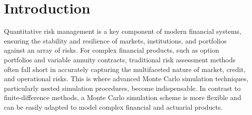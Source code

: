 \chapter{Introduction}

Quantitative risk management is a key component of modern financial systems, ensuring the stability and resilience of markets, institutions, and portfolios against an array of risks. 
For complex financial products, such as option portfolios and variable annuity contracts, traditional risk assessment methods often fall short in accurately capturing the multifaceted nature of market, credit, and operational risks. 
This is where advanced Monte Carlo simulation techniques, particularly nested simulation procedures, become indispensable.
In contrast to finite-difference methods, a Monte Carlo simulation scheme is more flexible and can be easily adapted to model complex financial and actuarial products.





